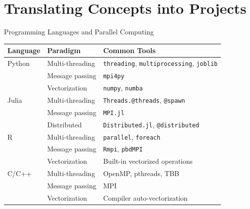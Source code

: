 \documentclass[aspectratio=169,xcolor={dvipsnames}]{beamer}
\begin{document}
\section{Translating Concepts into Projects}

\begin{frame}{{\Large Programming Languages and Parallel Computing}}
    \footnotesize
    \begin{tabular}{p{2cm}p{4cm}p{6cm}}
        \toprule
        \textbf{Language} & \textbf{Paradigm} & \textbf{Common Tools} \\
        \midrule
        Python & Multi-threading & \texttt{threading}, \texttt{multiprocessing}, \texttt{joblib} \\
               & Message passing & \texttt{mpi4py} \\
               & Vectorization & \texttt{numpy}, \texttt{numba} \\
        \midrule
        Julia & Multi-threading & \texttt{Threads.@threads}, \texttt{@spawn} \\
              & Message passing & \texttt{MPI.jl} \\
              & Distributed & \texttt{Distributed.jl}, \texttt{@distributed} \\
        \midrule
        R & Multi-threading & \texttt{parallel}, \texttt{foreach} \\
          & Message passing & \texttt{Rmpi}, \texttt{pbdMPI} \\
          & Vectorization & Built-in vectorized operations \\
        \midrule
        C/C++ & Multi-threading & OpenMP, pthreads, TBB \\
              & Message passing & MPI \\
              & Vectorization & Compiler auto-vectorization \\
    \end{tabular}
\end{frame}
\end{document}
